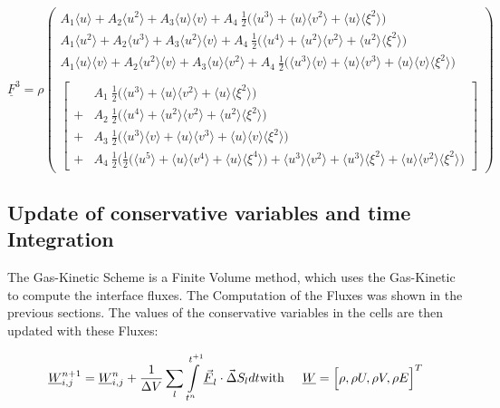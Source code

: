 \documentclass[
	pdftex,             %
	12pt,				%
	a4paper,		   	%
	english,				%
	oneside,			%
]{article}
\newcommand{\mom}[1]{\langle #1 \rangle}
\newcommand{\uu}[1]{\underline{#1}}
\newcommand{\vv}[1]{\vec{#1}}
\begin{document}
\begin{math}
\uu{F}^3
=
\rho
\left(
\begin{array}{l}
A_1 \mom{u} + 
A_2 \mom{u^2} + 
A_3 \mom{u}\mom{v}+ 
A_4 ~\tfrac{1}{2} \big( \mom{u^3} + \mom{u}\mom{v^2} + \mom{u}\mom{\xi^2} \big)
\\
A_1 \mom{u^2} + 
A_2 \mom{u^3} + 
A_3 \mom{u^2}\mom{v}+ 
A_4 ~\tfrac{1}{2} \big( \mom{u^4} + \mom{u^2}\mom{v^2} + \mom{u^2}\mom{\xi^2} \big)
\\
A_1 \mom{u}\mom{v} + 
A_2 \mom{u^2}\mom{v} + 
A_3 \mom{u}\mom{v^2}+ 
A_4 ~\tfrac{1}{2} \big( \mom{u^3}\mom{v} + \mom{u}\mom{v^3} + \mom{u}\mom{v}\mom{\xi^2} \big)
\\~\\
\left[
\begin{array}{ll}
  &	A_1 ~\tfrac{1}{2} \big( \mom{u^3} + \mom{u}\mom{v^2} + \mom{u}\mom{\xi^2} \big) \\
+ &	A_2 ~\tfrac{1}{2} \big( \mom{u^4} + \mom{u^2}\mom{v^2} + \mom{u^2}\mom{\xi^2} \big) \\
+ & A_3 ~\tfrac{1}{2} \big( \mom{u^3}\mom{v} + \mom{u}\mom{v^3} + \mom{u}\mom{v}\mom{\xi^2} \big) \\
+ & A_4 ~\tfrac{1}{2} \big( \tfrac{1}{2} \big( \mom{u^5} + \mom{u}\mom{v^4} + \mom{u}\mom{\xi^4} \big)
						  + \mom{u^3}\mom{v^2} + \mom{u^3}\mom{\xi^2} + \mom{u}\mom{v^2}\mom{\xi^2} \big)
\end{array}
\right]
\end{array}
\right)
\end{math}

\clearpage

\subsection*{Update of conservative variables and time Integration}

The Gas-Kinetic Scheme is a Finite Volume method, which uses the Gas-Kinetic to compute the interface fluxes. The Computation of the Fluxes was shown in the previous sections. The values of the conservative variables in the cells are then updated with these Fluxes:

\begin{equation}
\uu{W}_{i,j}^{n+1}
=
\uu{W}_{i,j}^{n}
+ \dfrac{1}{\Delta V}
\sum \limits_l
\int \limits_{t^n}^{t^{+1}}
\uu{\vv{F}}_l \cdot \vv{\Delta}S_l
dt
\hfill\textnormal{with}\hspace{0.5cm}
\uu{W} = \Big[ \rho, \rho U, \rho V, \rho E \Big]^T
\end{equation}
\end{document}
